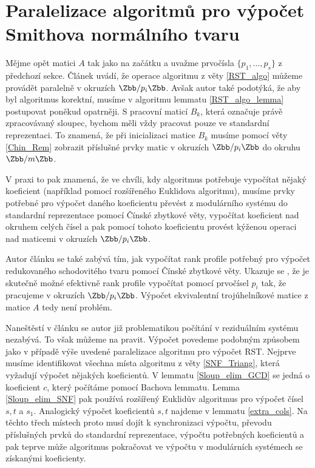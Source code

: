 \section{Paralelizace algoritmů pro výpočet Smithova normálního tvaru}
Mějme opět matici $ A $ tak jako na začátku a uvažme prvočísla
$ \{ p_1, \dots, p_s \} $ z předchozí sekce. Článek \cite[Theorem 16]{triang}
uvádí, že operace algoritmu z věty \ref{RST_algo} můžeme provádět paralelně
v okruzích $ \Zbb / p_i \Zbb $. Avšak autor také podotýká, že aby byl algoritmus
korektní, musíme v algoritmu lemmatu \ref{RST_algo_lemma} postupovat poněkud
opatrněji. S pracovní maticí $ B_k $, která označuje právě zpracovávaný sloupec,
bychom měli vždy pracovat pouze ve standardní reprezentaci. To znamená, že při
inicializaci matice $ B_k $ musíme pomocí věty \ref{Chin_Rem} zobrazit příslušné
prvky matic v okruzích $ \Zbb / p_i \Zbb $ do okruhu $ \Zbb / m \Zbb $.

V praxi to pak znamená, že ve chvíli, kdy algoritmus potřebuje vypočítat nějaký
koeficient (například pomocí rozšířeného Euklidova algoritmu), musíme prvky
potřebné pro výpočet daného koeficientu převést z modulárního systému do standardní
reprezentace pomocí Čínské zbytkové věty, vypočítat koeficient nad okruhem celých
čísel a pak pomocí tohoto koeficientu provést kýženou operaci nad maticemi v
okruzích $ \Zbb / p_i \Zbb $.

Autor článku \cite{triang} se
také zabývá tím, jak vypočítat rank profile potřebný pro výpočet redukovaného
schodovitého tvaru pomocí Čínské zbytkové věty. Ukazuje se \cite[Theorem 15]{triang},
že je skutečně možné efektivně rank profile vypočítat pomocí prvočísel $ p_i $
tak, že pracujeme v okruzích $ \Zbb / p_i \Zbb $.
Výpočet ekvivalentní trojúhelníkové matice z matice $ A $ tedy není problém.

Naneštěstí v článku \cite{SNF_Arne} se autor již problematikou počítání v
reziduálním systému nezabývá. To však můžeme na
pravit. Výpočet povedeme podobným
způsobem jako v případě výše uvedené paralelizace algoritmu pro výpočet RST.
Nejprve musíme identifikovat všechna místa algoritmu z věty \ref{SNF_Triang},
která vyžadují výpočet nějakých koeficientů. V lemmatu \ref{Sloup_elim_GCD}
se jedná o koeficient $ c $, který počítáme pomocí Bachova lemmatu. Lemma
\ref{Sloup_elim_SNF} pak používá rozšířený Euklidův algoritmus pro výpočet čísel
$ s, t $ a $ s_1 $. Analogický výpočet koeficientů $ s, t $ najdeme v lemmatu
\ref{extra_cols}. Na těchto třech místech proto musí dojít k synchronizaci výpočtu,
převodu příslušných prvků do standardní reprezentace, výpočtu potřebných
koeficientů a pak teprve může algoritmus pokračovat ve výpočtu v modulárních
systémech se získanými koeficienty.

